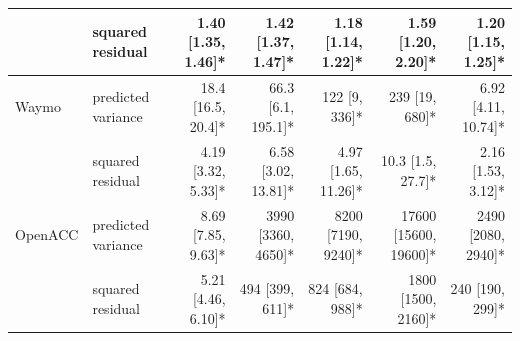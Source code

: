 \begin{table}[htbp]
\begin{tabular}{llrrrrr}
 & squared residual & 1.40 [1.35, 1.46]* & 1.42 [1.37, 1.47]* & 1.18 [1.14, 1.22]* & 1.59 [1.20, 2.20]* & 1.20 [1.15, 1.25]* \\
\midrule
Waymo & predicted variance & 18.4 [16.5, 20.4]* & 66.3 [6.1, 195.1]* & 122 [9, 336]* & 239 [19, 680]* & 6.92 [4.11, 10.74]* \\
 & squared residual & 4.19 [3.32, 5.33]* & 6.58 [3.02, 13.81]* & 4.97 [1.65, 11.26]* & 10.3 [1.5, 27.7]* & 2.16 [1.53, 3.12]* \\
\midrule
OpenACC & predicted variance & 8.69 [7.85, 9.63]* & 3990 [3360, 4650]* & 8200 [7190, 9240]* & 17600 [15600, 19600]* & 2490 [2080, 2940]* \\
 & squared residual & 5.21 [4.46, 6.10]* & 494 [399, 611]* & 824 [684, 988]* & 1800 [1500, 2160]* & 240 [190, 299]* \\
\bottomrule
\end{tabular}
\end{table}
